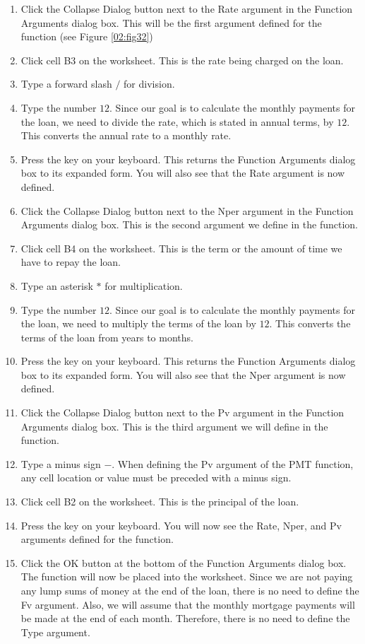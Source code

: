 \begin{enumerate}[resume]
	\item Click the Collapse Dialog button next to the Rate argument in the Function Arguments dialog box. This will be the first argument defined for the function (see Figure \ref{02:fig32})
	\item Click cell \textsf{B3} on the worksheet. This is the rate being charged on the loan.
	\item Type a forward slash $ / $ for division.
	\item Type the number $ 12 $. Since our goal is to calculate the monthly payments for the loan, we need to divide the rate, which is stated in annual terms, by $ 12 $. This converts the annual rate to a monthly rate.
	\item Press the  key on your keyboard. This returns the Function Arguments dialog box to its expanded form. You will also see that the Rate argument is now defined.
	\item Click the Collapse Dialog button next to the Nper argument in the Function Arguments dialog box. This is the second argument we define in the function.
	\item Click cell \textsf{B4} on the worksheet. This is the term or the amount of time we have to repay the loan.
	\item Type an asterisk $ * $ for multiplication.
	\item Type the number $ 12 $. Since our goal is to calculate the monthly payments for the loan, we need to multiply the terms of the loan by $ 12 $. This converts the terms of the loan from years to months.
	\item Press the  key on your keyboard. This returns the Function Arguments dialog box to its expanded form. You will also see that the Nper argument is now defined.
	\item Click the Collapse Dialog button next to the Pv argument in the Function Arguments dialog box. This is the third argument we will define in the function.
	\item Type a minus sign $ - $. When defining the Pv argument of the PMT function, any cell location or value must be preceded with a minus sign.
	\item Click cell \textsf{B2} on the worksheet. This is the principal of the loan.
	\item Press the  key on your keyboard. You will now see the Rate, Nper, and Pv arguments defined for the function.
	\item Click the OK button at the bottom of the Function Arguments dialog box. The function will now be placed into the worksheet. Since we are not paying any lump sums of money at the end of the loan, there is no need to define the Fv argument. Also, we will assume that the monthly mortgage payments will be made at the end of each month. Therefore, there is no need to define the Type argument.
\end{enumerate}

